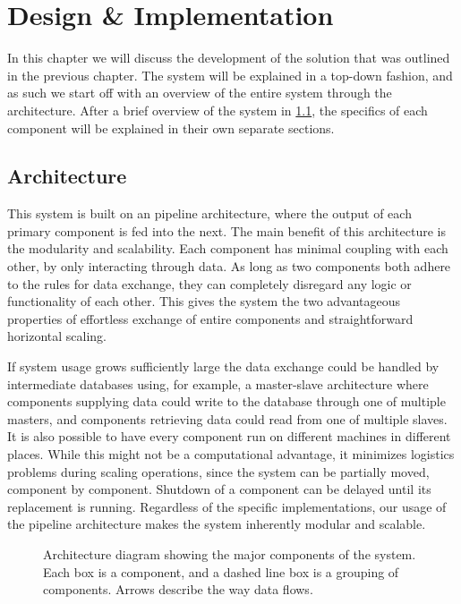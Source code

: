 \chapter{Design \& Implementation}\label{chap:design}
In this chapter we will discuss the development of the solution that was outlined in the previous chapter. The system will be explained in a top-down fashion, and as such we start off with an overview of the entire system through the architecture. After a brief overview of the system in \cref{sec:design_overview}, the specifics of each component will be explained in their own separate sections.

\section{Architecture}\label{sec:design_overview}
This system is built on an pipeline architecture, where the output of each primary component is fed into the next. The main benefit of this architecture is the modularity and scalability. Each component has minimal coupling with each other, by only interacting through data. As long as two components both adhere to the rules for data exchange, they can completely disregard any logic or functionality of each other. This gives the system the two advantageous properties of effortless exchange of entire components and straightforward horizontal scaling.

If system usage grows sufficiently large the data exchange could be handled by intermediate databases using, for example, a master-slave architecture where components supplying data could write to the database through one of multiple masters, and components retrieving data could read from one of multiple slaves. It is also possible to have every component run on different machines in different places. While this might not be a computational advantage, it minimizes logistics problems during scaling operations, since the system can be partially moved, component by component. Shutdown of a component can be delayed until its replacement is running. Regardless of the specific implementations, our usage of the pipeline architecture makes the system inherently modular and scalable.


\begin{figure}[tb]%
  \centering
  
\caption[Architecture diagram showing the major components of the system]{Architecture diagram showing the major components of the system. Each box is a component, and a dashed line box is a grouping of components. Arrows describe the way data flows.}%
\label{fig:system-overview}%
\end{figure}

